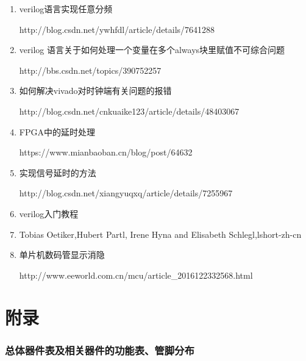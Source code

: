\documentclass[a4paper,11pt]{ctexart}
\begin{document}
\begin{enumerate}
  \item verilog语言实现任意分频 
  
  http://blog.csdn.net/ywhfdl/article/details/7641288
  \item verilog 语言关于如何处理一个变量在多个always块里赋值不可综合问题 
  
  http://bbs.csdn.net/topics/390752257
  \item 如何解决vivado对时钟端有关问题的报错 
  
  http://blog.csdn.net/cnkuaike123/article/details/48403067
  \item FPGA中的延时处理 
  
  https://www.mianbaoban.cn/blog/post/64632
  \item 实现信号延时的方法 
  
  http://blog.csdn.net/xiangyuqxq/article/details/7255967
  \item verilog入门教程
  \item Tobias Oetiker,Hubert Partl, Irene Hyna and Elisabeth Schlegl,lshort-zh-cn
  \item 单片机数码管显示消隐 
  
  http://www.eeworld.com.cn/mcu/article\_2016122332568.html
\end{enumerate}

\newpage
\appendix
\part{附录}
\section{总体器件表及相关器件的功能表、管脚分布}
\end{document}
